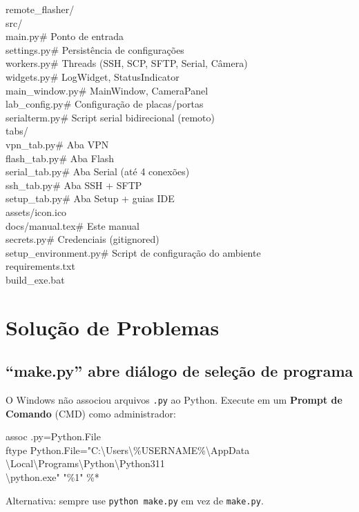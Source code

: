 \documentclass[12pt,a4paper]{article}
\begin{document}
\begin{codigobox}
remote\_flasher/\\
\quad src/\\
\quad\quad main.py\quad\quad\quad\quad\quad\quad\# Ponto de entrada\\
\quad\quad settings.py\quad\quad\quad\quad\# Persistência de configurações\\
\quad\quad workers.py\quad\quad\quad\quad\quad\# Threads (SSH, SCP, SFTP, Serial, Câmera)\\
\quad\quad widgets.py\quad\quad\quad\quad\quad\# LogWidget, StatusIndicator\\
\quad\quad main\_window.py\quad\quad\quad\# MainWindow, CameraPanel\\
\quad\quad lab\_config.py\quad\quad\quad\# Configuração de placas/portas\\
\quad\quad serialterm.py\quad\quad\quad\# Script serial bidirecional (remoto)\\
\quad\quad tabs/\\
\quad\quad\quad vpn\_tab.py\quad\quad\quad\# Aba VPN\\
\quad\quad\quad flash\_tab.py\quad\quad\# Aba Flash\\
\quad\quad\quad serial\_tab.py\quad\quad\# Aba Serial (até 4 conexões)\\
\quad\quad\quad ssh\_tab.py\quad\quad\quad\# Aba SSH + SFTP\\
\quad\quad\quad setup\_tab.py\quad\quad\# Aba Setup + guias IDE\\
\quad assets/icon.ico\\
\quad docs/manual.tex\quad\quad\quad\quad\# Este manual\\
\quad secrets.py\quad\quad\quad\quad\quad\quad\# Credenciais (gitignored)\\
\quad setup\_environment.py\quad\# Script de configuração do ambiente\\
\quad requirements.txt\\
\quad build\_exe.bat
\end{codigobox}

\section{Solução de Problemas}

\subsection{``make.py'' abre diálogo de seleção de programa}
O Windows não associou arquivos \texttt{.py} ao Python. Execute em um \textbf{Prompt de Comando} (CMD) como administrador:
\begin{codigobox}
assoc .py=Python.File\\
ftype Python.File="C:\textbackslash Users\textbackslash \%USERNAME\%\textbackslash AppData\\
\quad\textbackslash Local\textbackslash Programs\textbackslash Python\textbackslash Python311\\
\quad\textbackslash python.exe" "\%1" \%*
\end{codigobox}
Alternativa: sempre use \texttt{python make.py} em vez de \texttt{make.py}.
\end{document}
